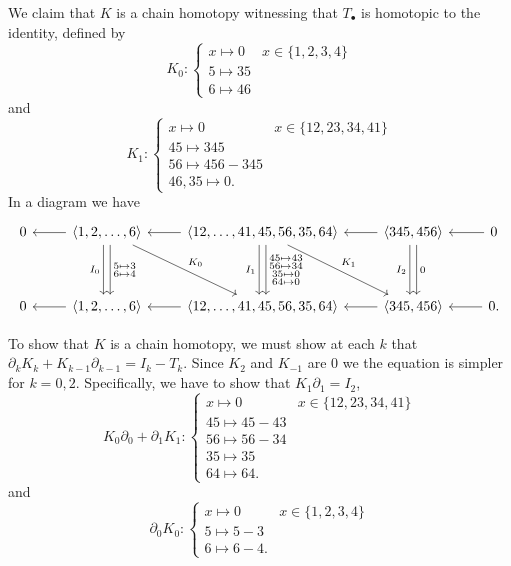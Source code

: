 \documentclass[12 pt, letterpaper]{hmcpset}
\begin{document}
\begin{solution}
	We claim that $K$ is a chain homotopy witnessing that $T_{\bullet}$ is homotopic to the identity, defined by
	\[
		K_{0} : \begin{cases}
			x \mapsto 0 & x \in \{ 1, 2, 3, 4 \} \\
			5 \mapsto 35 \\
			6 \mapsto 46
		\end{cases}
	\]
	and
	\[
		K_{1} : \begin{cases}
			x \mapsto 0 & x \in \{ 12, 23, 34, 41 \} \\
			45 \mapsto 345 \\
			56 \mapsto 456 - 345 \\
			46, 35 \mapsto 0.
		\end{cases}
	\]
	In a diagram we have
	\[
		\begin{tikzcd}
			0 & \left < 1, 2, \dots, 6 \right > \ar[l] \ar[dd, "I_{0}"', shift right] \ar[dd, "\substack{5 \mapsto 3 \\ 6 \mapsto 4}", shift left] \ar[rdd, "K_{0}"] & \left < 12, \dots, 41, 45, 56, 35, 64 \right > \ar[dd, "I_{1}"', shift right] \ar[dd, "\substack{45 \mapsto 43 \\ 56 \mapsto 34 \\ 35 \mapsto 0 \\ 64 \mapsto 0}", shift left] \ar[rdd, "K_{1}"] \ar[l] & \left < 345, 456 \right > \ar[l] \ar[dd, "I_{2}"', shift right] \ar[dd, "0", shift left] & 0 \ar[l] \\ \\
			0 & \left < 1, 2, \dots, 6 \right > \ar[l] & \left < 12, \dots, 41, 45, 56, 35, 64 \right > \ar[l] & \left < 345, 456 \right > \ar[l] & 0 \ar[l].
		\end{tikzcd}
	\]

	To show that $K$ is a chain homotopy, we must show at each $k$ that $\partial_{k} K_{k} + K_{k - 1} \partial_{k - 1} = I_{k} - T_{k}$. Since $K_{2}$ and $K_{-1}$ are $0$ we the equation is simpler for $k = 0, 2$. Specifically, we have to show that $K_{1} \partial_{1} = I_{2}$,
	\[
		K_{0} \partial_{0} + \partial_{1} K_{1} : \begin{cases}
			x \mapsto 0 & x \in \{ 12, 23, 34, 41 \} \\
			45 \mapsto 45 - 43 \\
			56 \mapsto 56 - 34 \\
			35 \mapsto 35 \\
			64 \mapsto 64.
		\end{cases}
	\]
	and
	\[
		\partial_{0} K_{0} : \begin{cases}
			x \mapsto 0 & x \in \{ 1, 2, 3, 4 \} \\
			5 \mapsto 5 - 3 \\
			6 \mapsto 6 - 4.
		\end{cases}
	\]


\end{solution}
\end{document}
